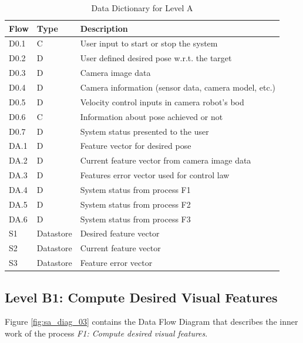 \begin{table}[!htb]
	\centering
	\begin{tabular}{lll}
		\toprule
		Flow & Type & Description \\
		\midrule
		D0.1 & C & User input to start or stop the system \\
		D0.2 & D & User defined desired pose w.r.t. the target \\
		D0.3 & D & Camera image data \\
		D0.4 & D & Camera information (sensor data, camera model, etc.) \\
		D0.5 & D & Velocity control inputs in camera robot's bod \\
		D0.6 & C & Information about pose achieved or not \\
		D0.7 & D & System status presented to the user \\
		\midrule
		DA.1 & D & Feature vector for desired pose \\
		DA.2 & D & Current feature vector from camera image data \\
		DA.3 & D & Features error vector used for control law \\
		DA.4 & D & System status from process F1 \\
		DA.5 & D & System status from process F2 \\
		DA.6 & D & System status from process F3 \\
		\midrule
		S1 & Datastore & Desired feature vector \\
		S2 & Datastore & Current feature vector \\
		S3 & Datastore & Feature error vector \\
		\bottomrule
	\end{tabular}
\caption{Data Dictionary for Level A}
\label{tab:DD-LA}
\end{table}

\pagebreak

\subsection{Level B1: Compute Desired Visual Features}
\label{sec:level-B1}


Figure \ref{fig:sa_diag_03} contains the Data Flow Diagram that describes the inner work of the process \textit{F1: Compute desired visual features}.

